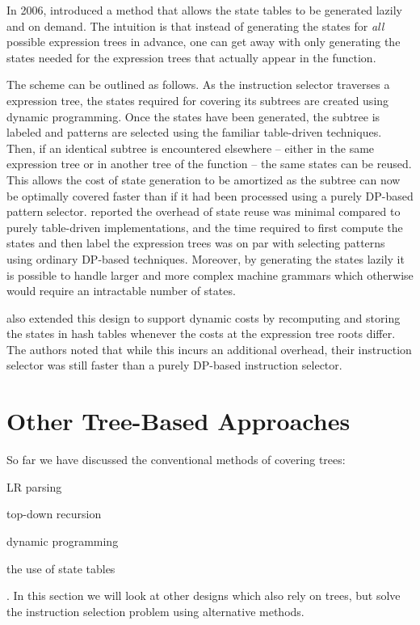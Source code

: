 In 2006, \textcite{ErtlEtAl:2006} introduced a method that allows the
\gls{state} tables to be generated lazily and on demand.
%
The intuition is that instead of generating the \glspl{state} for \emph{all}
possible \glspl{expression tree} in advance, one can get away with only
generating the \glspl{state} needed for the \glspl{expression tree} that
actually appear in the \gls{function}.

The scheme can be outlined as follows.
%
As the \gls{instruction selector} traverses a \gls{expression tree}, the
\glspl{state} required for covering its \glspl{subtree} are created using
dynamic programming.
%
Once the \glspl{state} have been generated, the \gls{subtree} is labeled and
\glspl{pattern} are selected using the familiar table-driven techniques.
%
Then, if an identical \gls{subtree} is encountered elsewhere -- either in the
same \gls{expression tree} or in another \gls{tree} of the \gls{function} -- the
same \glspl{state} can be reused.
%
This allows the cost of \gls{state} generation to be amortized as the
\gls{subtree} can now be optimally covered faster than if it had been processed
using a purely \gls{DP}-based \gls{pattern selector}.
%
\citeauthor{ErtlEtAl:2006} reported the overhead of \gls{state} reuse was
minimal compared to purely table-driven implementations, and the time required
to first compute the \glspl{state} and then label the \glspl{expression tree}
was on par with selecting \glspl{pattern} using ordinary \gls{DP}-based
techniques.
%
Moreover, by generating the \glspl{state} lazily it is possible to handle larger
and more complex \glspl{machine grammar} which otherwise would require an
intractable number of \glspl{state}.

\citeauthor{ErtlEtAl:2006} also extended this design to support dynamic costs by
recomputing and storing the \glspl{state} in hash tables whenever the costs at
the \gls{expression tree} \glspl{root} differ.
%
The authors noted that while this incurs an additional overhead, their
\gls{instruction selector} was still faster than a purely \gls{DP}-based
\gls{instruction selector}.


\section{Other Tree-Based Approaches}

So far we have discussed the conventional methods of covering \glspl{tree}:
%
\begin{inlinelist}[itemjoin={, }, itemjoin*={, and}]
  \item \gls{LR parsing}
  \item top-down recursion
  \item dynamic programming
  \item the use of \gls{state} tables
\end{inlinelist}.
%
In this section we will look at other designs which also rely on \glspl{tree},
but solve the \gls{instruction selection} problem using alternative methods.


